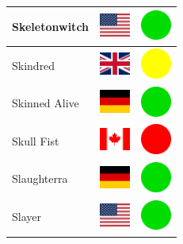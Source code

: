 \documentclass[12pt, a4paper, twoside]{report}
\begin{document}
\begin{center}
\begin{longtable}{|p{5cm}|p{2cm}|p{2cm}|}
Skeletonwitch & \includegraphics[width=1cm]{4x3/us} & \includegraphics[width=1cm]{likes/y} \\ \hline
Skindred & \includegraphics[width=1cm]{4x3/gb} & \includegraphics[width=1cm]{likes/m} \\ \hline
Skinned Alive & \includegraphics[width=1cm]{4x3/de} & \includegraphics[width=1cm]{likes/y} \\ \hline
Skull Fist & \includegraphics[width=1cm]{4x3/ca} & \includegraphics[width=1cm]{likes/n} \\ \hline
Slaughterra & \includegraphics[width=1cm]{4x3/de} & \includegraphics[width=1cm]{likes/y} \\ \hline
Slayer & \includegraphics[width=1cm]{4x3/us} & \includegraphics[width=1cm]{likes/y} \\ \hline

\end{longtable}
\end{center}
\end{document}
